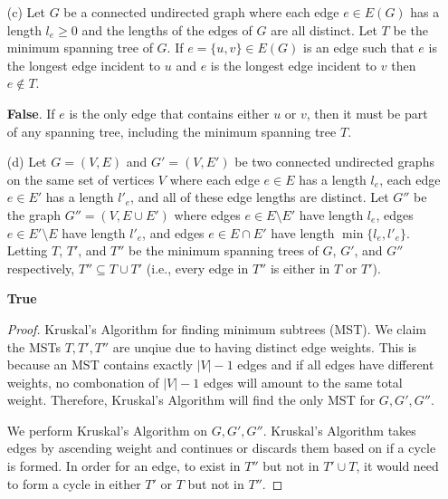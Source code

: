 \documentclass[12pt]{article}
\begin{document}
\begin{enumerate}
\begin{proof}
  Note that any spanning tree by definition is connected and acyclic and therefore has exactly $n-1$ edges. Let $T$ be the minimum spanning tree in $G$ with total length $d$. The total length of $f(T) = d + 2(|V|-1)$. 

  By definition of minimum spanning tree, the total length of any other spanning tree, $G'$, is greater than $d$ due to the distinctness of the edge weights and therefore, the legnth of $f(T') > d + 2(|V|-1)$. 
  
  $f(T)$ is the minimum spanning tree in $G'$.
  \end{proof}


\item [(c)] Let $G$ be a connected undirected graph where each edge $e \in E(G)$ has a length $l_e \geq 0$ and the lengths of the edges of $G$ are all distinct. Let $T$ be the minimum spanning tree of $G$. If $e = \{u,v\} \in E(G)$ is an edge such that $e$ is the longest edge incident to $u$ and $e$ is the longest edge incident to $v$ then $e \notin T$.

\textbf{False}. If $e$ is the only edge that contains either $u$ or $v$, then it must be part of any spanning tree, including the minimum spanning tree $T$.

\item [(d)] Let $G = (V,E)$ and $G' = (V,E')$ be two connected undirected graphs on the same set of vertices $V$ where each edge $e \in E$ has a length $l_e$, each edge $e \in E'$ has a length $l'_e$, and all of these edge lengths are distinct. Let $G''$ be the graph $G'' = (V,E \cup E')$ where edges $e \in E \setminus E'$ have length $l_e$, edges $e \in E' \setminus E$ have length $l'_e$, and edges $e \in E \cap E'$ have length $\min{\{l_e,l'_e\}}$. Letting $T$, $T'$, and $T''$ be the minimum spanning trees of $G$, $G'$, and $G''$ respectively, $T'' \subseteq T \cup T'$ (i.e., every edge in $T''$ is either in $T$ or $T'$).

\textbf{True}
\begin{proof}
  Kruskal's Algorithm for finding minimum subtrees (MST). We claim the MSTs $T, T', T''$ are unqiue due to having distinct edge weights. This is because an MST contains exactly $|V| - 1$ edges and if all edges have different weights, no combonation of $|V| - 1$ edges will amount to the same total weight. Therefore, Kruskal's Algorithm will find the only MST for $G, G', G''$.

  We perform Kruskal's Algorithm on $G, G', G''$. Kruskal's Algorithm takes edges by ascending weight and continues or discards them based on if a cycle is formed. In order for an edge, to exist in $T''$ but not in $T' \cup T$, it would need to form a cycle in either $T'$ or $T$ but not in $T''$.


\end{proof}
\end{enumerate}
\end{document}
